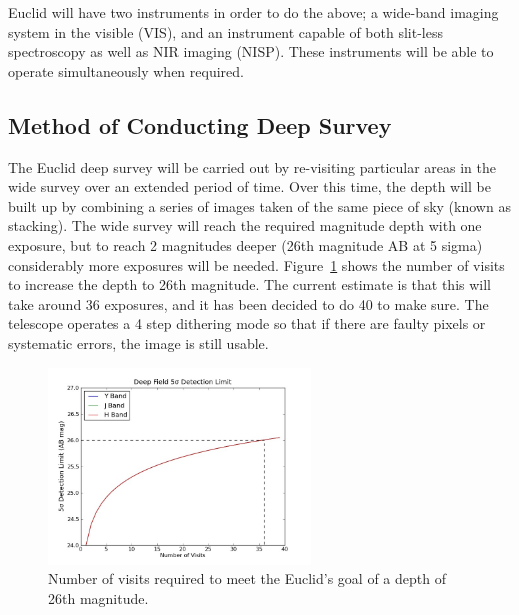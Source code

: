 		Euclid will have two instruments in order to do the above; a wide-band imaging system in the visible (VIS), and an instrument capable of both slit-less spectroscopy as well as NIR imaging (NISP). These instruments will be able to operate simultaneously when required.

	\subsection{Method of Conducting Deep Survey} %
	\label{sub:method_of_conducting_deep_survey}
		The Euclid deep survey will be carried out by re-visiting particular areas in the wide survey over an extended period of time. Over this time, the depth will be built up by combining a series of images taken of the same piece of sky (known as stacking). The wide survey will reach the required magnitude depth with one exposure, but to reach 2 magnitudes deeper (26th magnitude AB at 5 sigma) considerably more exposures will be needed. Figure~\ref{fig:euclid_visits_magnitude} shows the number of visits to increase the depth to 26th magnitude. The current estimate is that this will take around 36 exposures, and it has been decided to do 40 to make sure\cite{NISP_Performance_Analysis_ReportEUCL}. The telescope operates a 4 step dithering mode so that if there are faulty pixels or systematic errors, the image is still usable.
		\begin{figure}[ht]
			\begin{center}
				\includegraphics[width=0.62\textwidth]{../Images/Euclid_visits_magnitude.jpg}
			\end{center}
			\caption{Number of visits required to meet the Euclid’s goal of a depth of 26th magnitude.\label{fig:euclid_visits_magnitude}}
		\end{figure}

